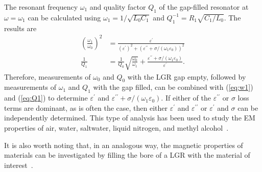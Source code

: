 \documentclass[conference]{IEEEtran}
\begin{document}
The resonant frequency $\omega_1$ and quality factor $Q_1$ of the gap-filled resonator at $\omega=\omega_1$ can be calculated using \mbox{$\omega_1=1/\sqrt{L_0C_1}$} and $Q_1^{-1}=R_1\sqrt{C_1/L_0}$.  The results are
\begin{align}
    \left(\frac{\omega_1}{\omega_0}\right)^2 &=\frac{\varepsilon^\prime}{\left(\varepsilon^\prime\right)^2+\left(\varepsilon^{\prime\prime}+\sigma/\left(\omega_1\varepsilon_0\right)\right)^2}\label{eq:w1}\\
    \frac{1}{Q_1} &=\frac{1}{Q_0}\sqrt{\frac{\omega_0}{\omega_1}}+\frac{\varepsilon^{\prime\prime}+\sigma/\left(\omega_1\varepsilon_0\right)}{\varepsilon^\prime}.\label{eq:Q1}
\end{align}
Therefore, measurements of $\omega_0$ and $Q_0$ with the LGR gap empty, followed by measurements of $\omega_1$ and $Q_1$ with the gap filled, can be combined with (\ref{eq:w1}) and (\ref{eq:Q1}) to determine $\varepsilon^\prime$ and $\varepsilon^{\prime\prime}+\sigma/\left(\omega_1\varepsilon_0\right)$.  If either of the $\varepsilon^{\prime\prime}$ or $\sigma$ loss terms are dominant, as is often the case, then either $\varepsilon^\prime$ and $\varepsilon^{\prime\prime}$ or $\varepsilon^\prime$ and $\sigma$ can be independently determined.  This type of analysis has been used to study the EM properties of air, water, saltwater, liquid nitrogen, and methyl alcohol~\cite{Bobowski:2013, Bobowski:2017}.

It is also worth noting that, in an analogous way, the magnetic properties of materials can be investigated by filling the bore of a LGR with the material of interest~\cite{Bobowski:2015, Bonn:1991, Hardy:1993, Dubreuil:2019, Bobowski:2018, Madsen:2020}.
\end{document}
